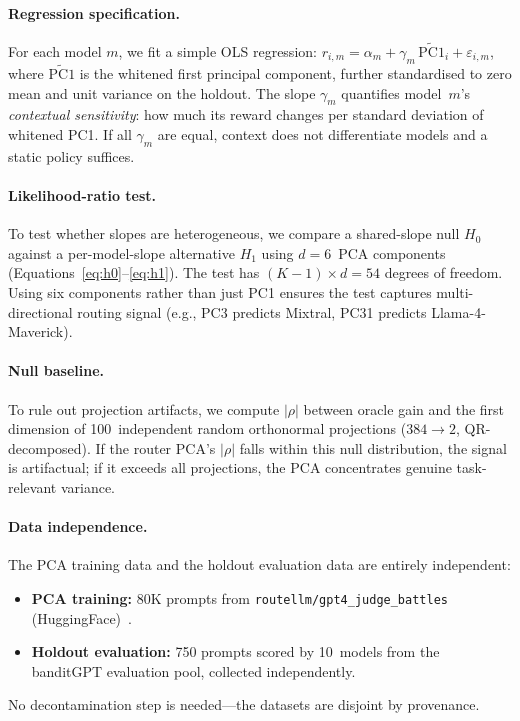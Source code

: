 \paragraph{Regression specification.}
For each model $m$, we fit a simple OLS regression:
$r_{i,m} = \alpha_m + \gamma_m \, \widetilde{\text{PC1}}_i + \varepsilon_{i,m}$,
where $\widetilde{\text{PC1}}$ is the whitened first principal component,
further standardised to zero mean and unit variance on the holdout.
The slope $\gamma_m$ quantifies model~$m$'s \emph{contextual
sensitivity}: how much its reward changes per standard deviation of
whitened PC1.  If all $\gamma_m$ are equal, context does not
differentiate models and a static policy suffices.

\paragraph{Likelihood-ratio test.}
To test whether slopes are heterogeneous, we compare a shared-slope null
$H_0$ against a per-model-slope alternative $H_1$ using $d{=}6$~PCA
components (Equations~\ref{eq:h0}--\ref{eq:h1}).  The test has
$(K{-}1) \times d = 54$ degrees of freedom.  Using six components rather
than just PC1 ensures the test captures multi-directional routing signal
(e.g., PC3 predicts Mixtral, PC31 predicts Llama-4-Maverick).

\paragraph{Null baseline.}
To rule out projection artifacts, we compute $|\rho|$ between oracle gain
and the first dimension of 100~independent random orthonormal projections
($384 \to 2$, QR-decomposed).  If the router PCA's $|\rho|$ falls within
this null distribution, the signal is artifactual; if it exceeds all
projections, the PCA concentrates genuine task-relevant variance.

\paragraph{Data independence.}
The PCA training data and the holdout evaluation data are entirely
independent:
\begin{itemize}[leftmargin=*,noitemsep,topsep=0pt]
    \item \textbf{PCA training:} 80K prompts from
          \texttt{routellm/gpt4\_judge\_battles}
          (HuggingFace)~\cite{ong2024routellm}.
    \item \textbf{Holdout evaluation:} 750 prompts scored by 10~models
          from the banditGPT evaluation pool, collected independently.
\end{itemize}
\noindent No decontamination step is needed---the datasets are disjoint
by provenance.

